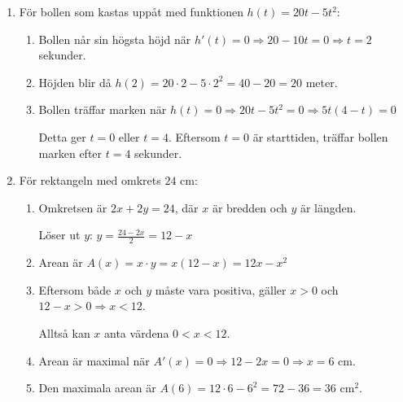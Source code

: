 \documentclass[a4paper,11pt]{article}
\begin{document}
\begin{enumerate}[label=\textbf{\arabic*.}]
    \item För bollen som kastas uppåt med funktionen $h(t) = 20t - 5t^2$:
    \begin{enumerate}[label=\alph*)]
        \item Bollen når sin högsta höjd när $h'(t) = 0 \Rightarrow 20 - 10t = 0 \Rightarrow t = 2$ sekunder.
        
        \item Höjden blir då $h(2) = 20 \cdot 2 - 5 \cdot 2^2 = 40 - 20 = 20$ meter.
        
        \item Bollen träffar marken när $h(t) = 0 \Rightarrow 20t - 5t^2 = 0 \Rightarrow 5t(4 - t) = 0$
        
        Detta ger $t = 0$ eller $t = 4$. Eftersom $t = 0$ är starttiden, träffar bollen marken efter $t = 4$ sekunder.
    \end{enumerate}
    
    \item För rektangeln med omkrets $24$ cm:
    \begin{enumerate}[label=\alph*)]
        \item Omkretsen är $2x + 2y = 24$, där $x$ är bredden och $y$ är längden.
        
        Löser ut $y$: $y = \frac{24 - 2x}{2} = 12 - x$
        
        \item Arean är $A(x) = x \cdot y = x(12 - x) = 12x - x^2$
        
        \item Eftersom både $x$ och $y$ måste vara positiva, gäller $x > 0$ och $12 - x > 0 \Rightarrow x < 12$.
        
        Alltså kan $x$ anta värdena $0 < x < 12$.
        
        \item Arean är maximal när $A'(x) = 0 \Rightarrow 12 - 2x = 0 \Rightarrow x = 6$ cm.
        
        \item Den maximala arean är $A(6) = 12 \cdot 6 - 6^2 = 72 - 36 = 36$ cm$^2$.
    \end{enumerate}
\end{enumerate}
\end{document}

